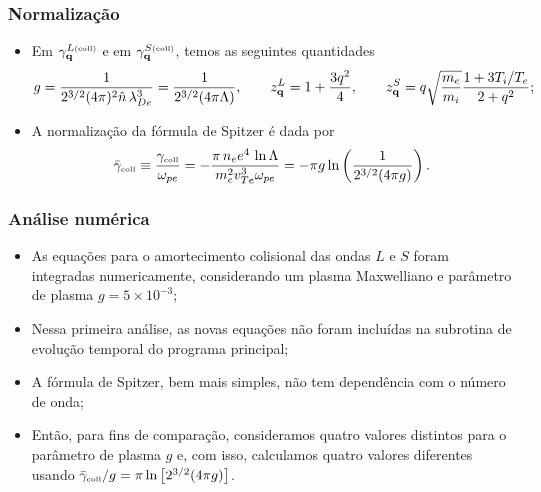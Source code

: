\documentclass[10pt,aspectratio=1610,lualatex]{beamer}
\begin{document}
\begin{frame}
  \frametitle{Normalização}
  \begin{itemize}
    \item Em $\gamma_{\bf q}^{L\mbox{\tiny(coll)}}$ e em
    $\gamma_{\bf q}^{S\mbox{\tiny(coll)}}$, temos as seguintes
    quantidades
    \begin{eqnarray*}
      g=\frac{1}{2^{3/2}(4\pi)^2\hat n\,\lambda_{De}^3}
      =\frac{1}{2^{3/2}(4\pi\Lambda)},\qquad
      z_{\bf q}^L=1+\frac{3q^2}{4},\qquad
      z_{\bf q}^S=q \sqrt{\frac{m_e}{m_i}}\frac{1+3T_i/T_e}{2+q^2};
    \end{eqnarray*}
    \vspace{0.3cm}
    \item A normalização da fórmula de Spitzer é dada por
    \begin{displaymath}
      \bar \gamma_{\mbox{\tiny coll}}\equiv
      \frac{\gamma_{\mbox{\tiny coll}}}{\omega_{pe}}
      =-\frac{\pi\, n_ee^4\,\ln \Lambda}{m_e^2 v_{Te}^3\omega_{pe}}
      =- \pi g \ln \left( \frac{1}{2^{3/2}(4\pi g)} \right).
    \end{displaymath}
  \end{itemize}
\end{frame}

\begin{frame}
  \frametitle{Análise numérica}
  \begin{itemize}
    \item As equações para o amortecimento colisional das ondas $L$
    e $S$ foram integradas numericamente, considerando um plasma
    Maxwelliano e parâmetro de plasma $g=5\times 10^{-3}$;
    \vspace{0.25cm}
    \pause
    \item Nessa primeira análise, as novas equações não foram
    incluídas na subrotina de evolução temporal do programa
    principal;
    \vspace{0.25cm}
    \pause
    \item A fórmula de Spitzer, bem mais simples, não tem
    dependência com o número de onda;\vspace{0.25cm}
    \pause
    \item Então, para fins de comparação, consideramos quatro
    valores distintos para o parâmetro de plasma $g$ e, com
    isso, calculamos quatro valores diferentes usando
    $\bar \gamma_{\mbox{\tiny coll}}/g
    = \pi \ln \left[2^{3/2}(4\pi g)\right]$.
  \end{itemize}
\end{frame}
\end{document}
